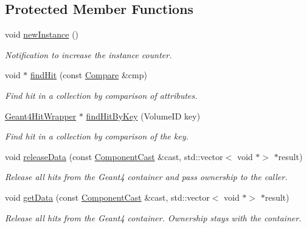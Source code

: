 \subsection*{Protected Member Functions}
\begin{DoxyCompactItemize}
\item 
void \hyperlink{class_d_d4hep_1_1_simulation_1_1_geant4_hit_collection_abd59378fa4d12c151299841d340fd63e}{new\+Instance} ()
\begin{DoxyCompactList}\small\item\em Notification to increase the instance counter. \end{DoxyCompactList}\item 
void $\ast$ \hyperlink{class_d_d4hep_1_1_simulation_1_1_geant4_hit_collection_a4c854c0d590b4d453b2863933dfa31a1}{find\+Hit} (const \hyperlink{class_d_d4hep_1_1_simulation_1_1_geant4_hit_collection_1_1_compare}{Compare} \&cmp)
\begin{DoxyCompactList}\small\item\em Find hit in a collection by comparison of attributes. \end{DoxyCompactList}\item 
\hyperlink{class_d_d4hep_1_1_simulation_1_1_geant4_hit_wrapper}{Geant4\+Hit\+Wrapper} $\ast$ \hyperlink{class_d_d4hep_1_1_simulation_1_1_geant4_hit_collection_a912bb8ef9922058b0dbb3dbc5ee116bc}{find\+Hit\+By\+Key} (Volume\+ID key)
\begin{DoxyCompactList}\small\item\em Find hit in a collection by comparison of the key. \end{DoxyCompactList}\item 
void \hyperlink{class_d_d4hep_1_1_simulation_1_1_geant4_hit_collection_ac36ede05cde4cfc230a06e7ca7886eef}{release\+Data} (const \hyperlink{class_d_d4hep_1_1_component_cast}{Component\+Cast} \&cast, std\+::vector$<$ void $\ast$$>$ $\ast$result)
\begin{DoxyCompactList}\small\item\em Release all hits from the Geant4 container and pass ownership to the caller. \end{DoxyCompactList}\item 
void \hyperlink{class_d_d4hep_1_1_simulation_1_1_geant4_hit_collection_a86a7f5d549f5123ea1808952ed8cac57}{get\+Data} (const \hyperlink{class_d_d4hep_1_1_component_cast}{Component\+Cast} \&cast, std\+::vector$<$ void $\ast$$>$ $\ast$result)
\begin{DoxyCompactList}\small\item\em Release all hits from the Geant4 container. Ownership stays with the container. \end{DoxyCompactList}\end{DoxyCompactItemize}
